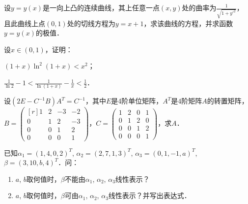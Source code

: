 \documentclass[plain,noanswer,medmath]{../../template/jnuexam}
\begin{document}
\begin{problem}
设$y = y(x)$是一向上凸的连续曲线，其上任意一点$(x,y)$处的曲率为$\frac{1}{\sqrt{1 + y'^2}}$，
且此曲线上点$(0,1)$处的切线方程为$y = x + 1$，求该曲线的方程，并求函数$y = y(x)$的极值．
\end{problem}



\begin{problem}
设$x \in \left(0,1 \right)$，证明：
\begin{enumerate*}
\item $(1 + x) \ln^2(1 + x) < x^2$；
\item $\frac{1}{\ln 2} - 1 < \frac{1}{\ln(1 + x)} - \frac{1}{x} < \frac{1}{2}$．
\end{enumerate*}
\end{problem}



\begin{problem}
设$\left(2E - C^{-1} B \right) A^T = C^{-1}$，其中$E$是4阶单位矩阵，$A^T$是$4$阶矩阵$A$的转置矩阵，
$B = \begin{pmatrix*}[r]
  1 & 2 & -3 & -2 \\
  0 & 1 &  2 & -3 \\
  0 & 0 &  1 & 2 \\
  0 & 0 &  0 & 1
\end{pmatrix*}$，$C = \begin{pmatrix}
  1 & 2 & 0 & 1 \\
  0 & 1 & 2 & 0 \\
  0 & 0 & 1 & 2 \\
  0 & 0 & 0 & 1
\end{pmatrix}$，求$A$．
\end{problem}



\begin{problem}
已知$\alpha_1 = (1,4,0,2)^T$, $\alpha_2 = (2,7,1,3)^T$, $\alpha_3 = (0,1, - 1,a)^T$, 
$\beta = (3,10,b,4)^T$．问：
\begin{enumerate}
\item $a$, $b$取何值时，$\beta$不能由$\alpha_1$, $\alpha_2$, $\alpha_3$线性表示？
\item $a$, $b$取何值时，$\beta$可由$\alpha_1$, $\alpha_2$, $\alpha_3$线性表示？并写出表达式．
\end{enumerate}
\end{problem}
\end{document}
